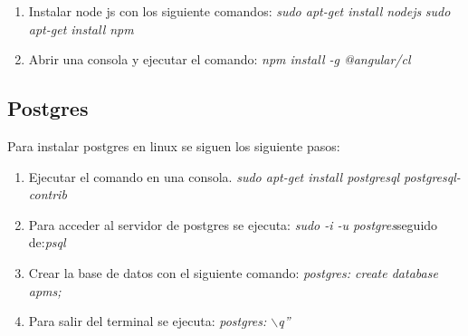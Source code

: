 \begin{enumerate}
  \item Instalar node js con los siguiente comandos:
  \textit{sudo apt-get install nodejs} 
  \newline\textit{sudo apt-get install npm}
  \item Abrir una consola y ejecutar el comando:
  \textit{npm install -g @angular/cl} 
\end{enumerate}

\subsection{Postgres}
Para instalar postgres en linux se siguen los siguiente pasos:

\begin{enumerate}
  \item Ejecutar el comando en una consola. 
  \textit{sudo apt-get install postgresql postgresql-contrib} 
  \item Para acceder al servidor de postgres se ejecuta:
  \textit{sudo -i -u postgres}seguido de:\textit{psql} 
  \item Crear la base de datos con el siguiente comando: 
  \textit{postgres: create database apms;} 
  \item Para salir del terminal se ejecuta:
  \textit{postgres: $\backslash$q''} 
\end{enumerate}

